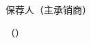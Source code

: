 \vfill

{\centering
{\heiti{}保荐人（主承销商）\par}
\vspace{4mm}
{\heiti{}\gsSponsor\par}
\vspace{2.5mm}
{（\gsSponsorAddr）\par}
\par}

\vspace{10mm}
\endgroup
\clearpage
